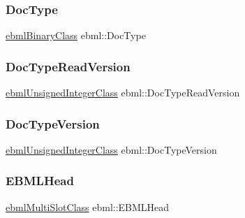 \subsubsection{\texorpdfstring{Doc\+Type}{DocType}}
{\footnotesize\ttfamily \mbox{\hyperlink{namespaceebml_a4fe139b904ac34f0e3036c9451b4b18b}{ebml\+Binary\+Class}} ebml\+::\+Doc\+Type}

\mbox{\label{namespaceebml_acd5324e76213e2721983c93bd909eeff}} 
\subsubsection{\texorpdfstring{Doc\+Type\+Read\+Version}{DocTypeReadVersion}}
{\footnotesize\ttfamily \mbox{\hyperlink{namespaceebml_a506b246c5594e5d0322c3c05e9820fd2}{ebml\+Unsigned\+Integer\+Class}} ebml\+::\+Doc\+Type\+Read\+Version}

\mbox{\label{namespaceebml_a4bfea9b659c99c0f0d0dc51026f480ca}} 
\subsubsection{\texorpdfstring{Doc\+Type\+Version}{DocTypeVersion}}
{\footnotesize\ttfamily \mbox{\hyperlink{namespaceebml_a506b246c5594e5d0322c3c05e9820fd2}{ebml\+Unsigned\+Integer\+Class}} ebml\+::\+Doc\+Type\+Version}

\mbox{\label{namespaceebml_a969dbd2316937386e704f1aae53ed8b9}} 
\subsubsection{\texorpdfstring{E\+B\+M\+L\+Head}{EBMLHead}}
{\footnotesize\ttfamily \mbox{\hyperlink{classebml_1_1ebmlMultiSlotClass}{ebml\+Multi\+Slot\+Class}} ebml\+::\+E\+B\+M\+L\+Head}

\mbox{\label{namespaceebml_aa5391f5da29eee93d9bbb4faef121430}} 
